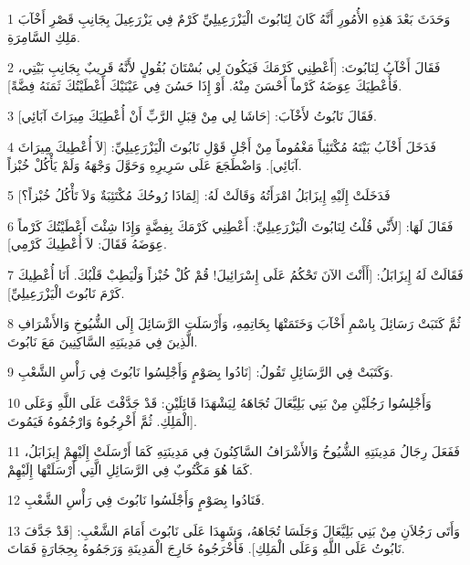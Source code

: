 \par 1 وَحَدَثَ بَعْدَ هَذِهِ الأُمُورِ أَنَّهُ كَانَ لِنَابُوتَ الْيَزْرَعِيلِيِّ كَرْمٌ فِي يَزْرَعِيلَ بِجَانِبِ قَصْرِ أَخْآبَ مَلِكِ السَّامِرَةِ.
\par 2 فَقَالَ أَخْآبُ لِنَابُوتَ: [أَعْطِنِي كَرْمَكَ فَيَكُونَ لِي بُسْتَانَ بُقُولٍ لأَنَّهُ قَرِيبٌ بِجَانِبِ بَيْتِي، فَأُعْطِيَكَ عِوَضَهُ كَرْماً أَحْسَنَ مِنْهُ. أَوْ إِذَا حَسُنَ فِي عَيْنَيْكَ أَعْطَيْتُكَ ثَمَنَهُ فِضَّةً].
\par 3 فَقَالَ نَابُوتُ لأَخْآبَ: [حَاشَا لِي مِنْ قِبَلِ الرَّبِّ أَنْ أُعْطِيَكَ مِيرَاثَ آبَائِي].
\par 4 فَدَخَلَ أَخْآبُ بَيْتَهُ مُكْتَئِباً مَغْمُوماً مِنْ أَجْلِ قَوْلِ نَابُوتَ الْيَزْرَعِيلِيِّ: [لاَ أُعْطِيكَ مِيرَاثَ آبَائِي]. وَاضْطَجَعَ عَلَى سَرِيرِهِ وَحَوَّلَ وَجْهَهُ وَلَمْ يَأْكُلْ خُبْزاً.
\par 5 فَدَخَلَتْ إِلَيْهِ إِيزَابَلُ امْرَأَتُهُ وَقَالَتْ لَهُ: [لِمَاذَا رُوحُكَ مُكْتَئِبَةٌ وَلاَ تَأْكُلُ خُبْزاً؟]
\par 6 فَقَالَ لَهَا: [لأَنِّي قُلْتُ لِنَابُوتَ الْيَزْرَعِيلِيِّ: أَعْطِنِي كَرْمَكَ بِفِضَّةٍ وَإِذَا شِئْتَ أَعْطَيْتُكَ كَرْماً عِوَضَهُ فَقَالَ: لاَ أُعْطِيكَ كَرْمِي].
\par 7 فَقَالَتْ لَهُ إِيزَابَلُ: [أَأَنْتَ الآنَ تَحْكُمُ عَلَى إِسْرَائِيلَ! قُمْ كُلْ خُبْزاً وَلْيَطِبْ قَلْبُكَ. أَنَا أُعْطِيكَ كَرْمَ نَابُوتَ الْيَزْرَعِيلِيِّ].
\par 8 ثُمَّ كَتَبَتْ رَسَائِلَ بِاسْمِ أَخْآبَ وَخَتَمَتْهَا بِخَاتِمِهِ، وَأَرْسَلَتِ الرَّسَائِلَ إِلَى الشُّيُوخِ وَالأَشْرَافِ الَّذِينَ فِي مَدِينَتِهِ السَّاكِنِينَ مَعَ نَابُوتَ.
\par 9 وَكَتَبَتْ فِي الرَّسَائِلِ تَقُولُ: [نَادُوا بِصَوْمٍ وَأَجْلِسُوا نَابُوتَ فِي رَأْسِ الشَّعْبِ.
\par 10 وَأَجْلِسُوا رَجُلَيْنِ مِنْ بَنِي بَلِيَّعَالَ تُجَاهَهُ لِيَشْهَدَا قَائِلَيْنِ: قَدْ جَدَّفْتَ عَلَى اللَّهِ وَعَلَى الْمَلِكِ. ثُمَّ أَخْرِجُوهُ وَارْجُمُوهُ فَيَمُوتَ].
\par 11 فَفَعَلَ رِجَالُ مَدِينَتِهِ الشُّيُوخُ وَالأَشْرَافُ السَّاكِنُونَ فِي مَدِينَتِهِ كَمَا أَرْسَلَتْ إِلَيْهِمْ إِيزَابَلُ، كَمَا هُوَ مَكْتُوبٌ فِي الرَّسَائِلِ الَّتِي أَرْسَلَتْهَا إِلَيْهِمْ.
\par 12 فَنَادُوا بِصَوْمٍ وَأَجْلَسُوا نَابُوتَ فِي رَأْسِ الشَّعْبِ.
\par 13 وَأَتَى رَجُلاَنِ مِنْ بَنِي بَلِيَّعَالَ وَجَلَسَا تُجَاهَهُ، وَشَهِدَا عَلَى نَابُوتَ أَمَامَ الشَّعْبِ: [قَدْ جَدَّفَ نَابُوتُ عَلَى اللَّهِ وَعَلَى الْمَلِكِ]. فَأَخْرَجُوهُ خَارِجَ الْمَدِينَةِ وَرَجَمُوهُ بِحِجَارَةٍ فَمَاتَ.
